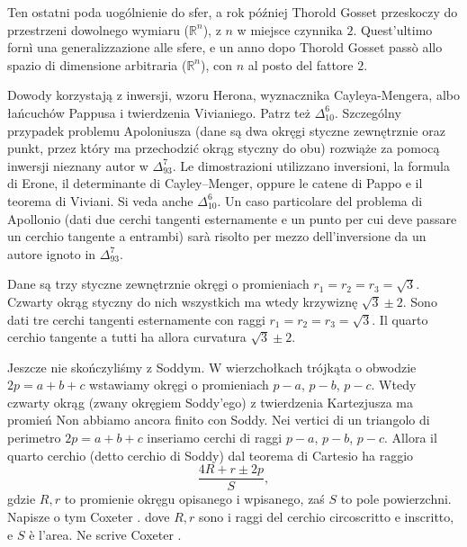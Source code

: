 Ten ostatni poda uogólnienie do sfer, a rok później Thorold Gosset przeskoczy do przestrzeni dowolnego wymiaru ($\mathbb R^n$), z $n$ w miejsce czynnika $2$.%
Quest'ultimo fornì una generalizzazione alle sfere, e un anno dopo Thorold Gosset passò allo spazio di dimensione arbitraria ($\mathbb R^n$), con $n$ al posto del fattore $2$.%
%

Dowody korzystają z inwersji, wzoru Herona, wyznacznika Cayleya-Mengera, albo łańcuchów Pappusa i twierdzenia Vivianiego. %
Patrz też $\Delta_{10}^6$. %
Szczególny przypadek problemu Apoloniusza (dane są dwa okręgi styczne zewnętrznie oraz punkt, przez który ma przechodzić okrąg styczny do obu) rozwiąże za pomocą inwersji nieznany autor w $\Delta_{93}^{7}$. %
Le dimostrazioni utilizzano inversioni, la formula di Erone, il determinante di Cayley--Menger, oppure le catene di Pappo e il teorema di Viviani.%
Si veda anche $\Delta_{10}^6$. %
Un caso particolare del problema di Apollonio (dati due cerchi tangenti esternamente e un punto per cui deve passare un cerchio tangente a entrambi) sarà risolto per mezzo dell'inversione da un autore ignoto in $\Delta_{93}^{7}$. %

\begin{example}
Dane są trzy styczne zewnętrznie okręgi o promieniach $r_1 = r_2 = r_3 = \sqrt{3}$. %
Czwarty okrąg styczny do nich wszystkich ma wtedy krzywiznę $\sqrt 3 \pm 2$.%
Sono dati tre cerchi tangenti esternamente con raggi $r_1 = r_2 = r_3 = \sqrt{3}$. %
Il quarto cerchio tangente a tutti ha allora curvatura $\sqrt 3 \pm 2$.%
\end{example}

Jeszcze nie skończyliśmy z Soddym. %
W wierzchołkach trójkąta o obwodzie $2p = a + b + c$ wstawiamy okręgi o promieniach $p - a$, $p - b$, $p - c$. %
Wtedy czwarty okrąg (zwany okręgiem Soddy'ego) z twierdzenia Kartezjusza ma promień%
Non abbiamo ancora finito con Soddy. %
Nei vertici di un triangolo di perimetro $2p = a + b + c$ inseriamo cerchi di raggi $p - a$, $p - b$, $p - c$. %
Allora il quarto cerchio (detto cerchio di Soddy) dal teorema di Cartesio ha raggio%
\begin{equation}
    \frac{4R + r \pm 2p}{S},
\end{equation}
gdzie $R, r$ to promienie okręgu opisanego i wpisanego, zaś $S$ to pole powierzchni. %
Napisze o tym Coxeter \cite[s. 29-31]{coxeter_1967}.%
dove $R, r$ sono i raggi del cerchio circoscritto e inscritto, e $S$ è l'area. %
Ne scrive Coxeter \cite[s. 29-31]{coxeter_1967}.%

